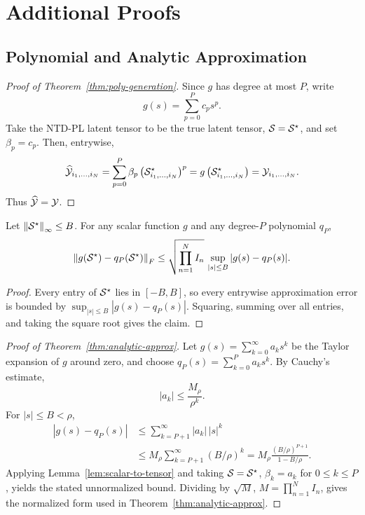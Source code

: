 \section{Additional Proofs}
\label{app:proofs}

\subsection{Polynomial and Analytic Approximation}

\begin{proof}[Proof of Theorem~\ref{thm:poly-generation}]
Since \(g\) has degree at most \(P\), write
\begin{equation}
  g(s)=\sum_{p=0}^{P} c_p s^p.
\end{equation}
Take the NTD-PL latent tensor to be the true latent tensor,
\(\mathcal{S}=\mathcal{S}^\star\), and set \(\beta_p=c_p\). Then, entrywise,
\begin{equation}
  \widehat{\mathcal{Y}}_{i_1,\ldots,i_N}
  =
  \sum_{p=0}^{P} \beta_p
  \left(\mathcal{S}^\star_{i_1,\ldots,i_N}\right)^p
  =
  g\left(\mathcal{S}^\star_{i_1,\ldots,i_N}\right)
  =
  \mathcal{Y}_{i_1,\ldots,i_N}.
\end{equation}
Thus \(\widehat{\mathcal{Y}}=\mathcal{Y}\).
\end{proof}

\begin{lemma}
\label{lem:scalar-to-tensor}
Let \(\left\lVert \mathcal{S}^\star \right\rVert_\infty\le B\). For any scalar function \(g\) and any
degree-\(P\) polynomial \(q_P\),
\begin{equation}
  \left\lVert g(\mathcal{S}^\star)-q_P(\mathcal{S}^\star) \right\rVert_F
  \le
  \sqrt{\prod_{n=1}^{N}I_n}\,
  \sup_{|s|\le B}|g(s)-q_P(s)|.
\end{equation}
\end{lemma}

\begin{proof}
Every entry of \(\mathcal{S}^\star\) lies in \([-B,B]\), so every entrywise
approximation error is bounded by
\(\sup_{|s|\le B}|g(s)-q_P(s)|\). Squaring, summing over all entries, and
taking the square root gives the claim.
\end{proof}

\begin{proof}[Proof of Theorem~\ref{thm:analytic-approx}]
Let \(g(s)=\sum_{k=0}^{\infty} a_k s^k\) be the Taylor expansion of \(g\)
around zero, and choose \(q_P(s)=\sum_{k=0}^{P}a_k s^k\). By Cauchy's
estimate,
\begin{equation}
  |a_k| \le \frac{M_\rho}{\rho^k}.
\end{equation}
For \(|s|\le B<\rho\),
\begin{align}
  |g(s)-q_P(s)|
  &\le
  \sum_{k=P+1}^{\infty}|a_k|\,|s|^k \\
  &\le
  M_\rho\sum_{k=P+1}^{\infty}(B/\rho)^k
  =
  M_\rho\frac{(B/\rho)^{P+1}}{1-B/\rho}.
\end{align}
Applying Lemma~\ref{lem:scalar-to-tensor} and taking
\(\mathcal{S}=\mathcal{S}^\star\), \(\beta_k=a_k\) for \(0\le k\le P\), yields the stated
unnormalized bound. Dividing by
\(\sqrt{M}\), \(M=\prod_{n=1}^{N}I_n\), gives the normalized form used in
Theorem~\ref{thm:analytic-approx}.
\end{proof}

